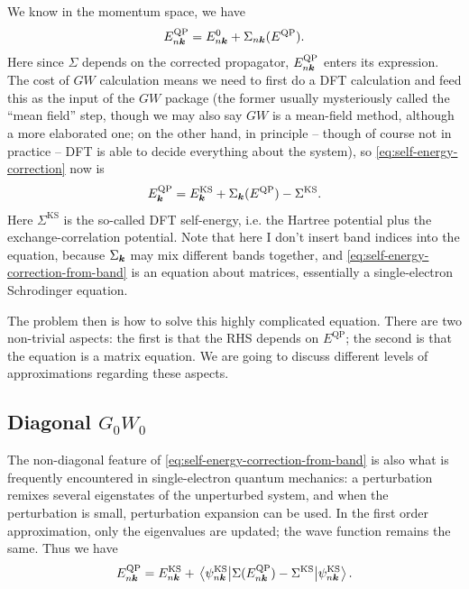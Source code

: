 \documentclass[hyperref, a4paper, 12pt]{report}
\begin{document}
We know in the momentum space, we have 
\begin{equation}
    E^{\text{QP}}_{n \vb*{k}} = E^{0}_{n \vb*{k}} + \Sigma_{n \vb*{k}} (E^{\text{QP}}).
    \label{eq:self-energy-correction}
\end{equation}
Here since $\Sigma$ depends on the corrected propagator,
$E^\text{QP}_{n \vb*{k}}$ enters its expression.
The cost of $GW$ calculation means we need to first do a DFT calculation 
and feed this as the input of the $GW$ package 
(the former usually mysteriously called the ``mean field'' step,
though we may also say $GW$ is a mean-field method,
although a more elaborated one;
on the other hand, in principle -- though of course not in practice -- 
DFT is able to decide everything about the system), 
so \eqref{eq:self-energy-correction} now is 
\begin{equation}
    E^{\text{QP}}_{\vb*{k}} = E^{\text{KS}}_{\vb*{k}} + \Sigma_{\vb*{k}} (E^{\text{QP}}) - \Sigma^{\text{KS}}.
    \label{eq:self-energy-correction-from-band}
\end{equation}
Here $\Sigma^{\text{KS}}$ is the so-called DFT self-energy,
i.e. the Hartree potential plus the exchange-correlation potential.
Note that here I don't insert band indices into the equation,
because $\Sigma_{\vb*{k}}$ may mix different bands together,
and \eqref{eq:self-energy-correction-from-band} is an equation about matrices,
essentially a single-electron Schrodinger equation.

The problem then is how to solve this highly complicated equation. 
There are two non-trivial aspects: 
the first is that the RHS depends on $E^{\text{QP}}$;
the second is that the equation is a matrix equation. 
We are going to discuss different levels of approximations 
regarding these aspects. 

\subsection{Diagonal $G_0 W_0$}

The non-diagonal feature of \eqref{eq:self-energy-correction-from-band} 
is also what is frequently encountered in single-electron quantum mechanics: 
a perturbation remixes several eigenstates of the unperturbed system, 
and when the perturbation is small, 
perturbation expansion can be used.
In the first order approximation, 
only the eigenvalues are updated; 
the wave function remains the same. Thus we have 
\begin{equation}
    E^{\text{QP}}_{n \vb*{k}} = E^{\text{KS}}_{n \vb*{k}} + 
    \mel{\psi^{\text{KS}}_{n \vb*{k}}}{\Sigma (E^{\text{QP}}_{n \vb*{k}}) - \Sigma^{\text{KS}}}{\psi^{\text{KS}}_{n \vb*{k}}}.
    \label{eq:self-energy-first-order}
\end{equation}
\end{document}

